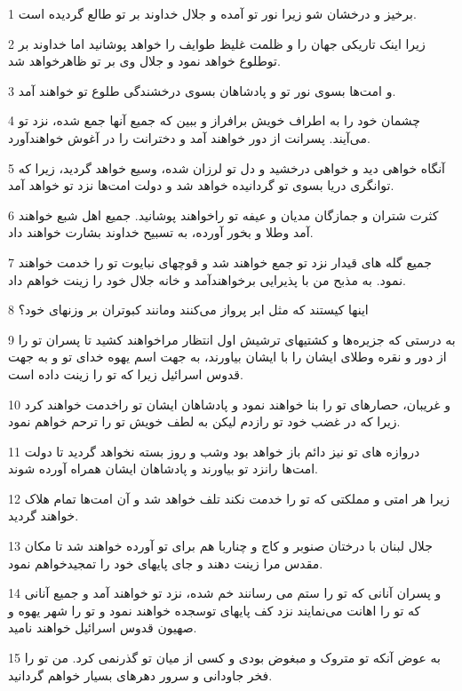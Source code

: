 \par 1 برخیز و درخشان شو زیرا نور تو آمده و جلال خداوند بر تو طالع گردیده است.
\par 2 زیرا اینک تاریکی جهان را و ظلمت غلیظ طوایف را خواهد پوشانید اما خداوند بر توطلوع خواهد نمود و جلال وی بر تو ظاهرخواهد شد.
\par 3 و امت‌ها بسوی نور تو و پادشاهان بسوی درخشندگی طلوع تو خواهند آمد.
\par 4 چشمان خود را به اطراف خویش برافراز و ببین که جمیع آنها جمع شده، نزد تو می‌آیند. پسرانت از دور خواهند آمد و دخترانت را در آغوش خواهند‌آورد.
\par 5 آنگاه خواهی دید و خواهی درخشید و دل تو لرزان شده، وسیع خواهد گردید، زیرا که توانگری دریا بسوی تو گردانیده خواهد شد و دولت امت‌ها نزد تو خواهد آمد.
\par 6 کثرت شتران و جمازگان مدیان و عیفه تو راخواهند پوشانید. جمیع اهل شبع خواهند آمد وطلا و بخور آورده، به تسبیح خداوند بشارت خواهند داد.
\par 7 جمیع گله های قیدار نزد تو جمع خواهند شد و قوچهای نبایوت تو را خدمت خواهند نمود. به مذبح من با پذیرایی برخواهندآمد و خانه جلال خود را زینت خواهم داد.
\par 8 اینها کیستند که مثل ابر پرواز می‌کنند ومانند کبوتران بر وزنهای خود؟
\par 9 به درستی که جزیره‌ها و کشتیهای ترشیش اول انتظار مراخواهند کشید تا پسران تو را از دور و نقره وطلای ایشان را با ایشان بیاورند، به جهت اسم یهوه خدای تو و به جهت قدوس اسرائیل زیرا که تو را زینت داده است.
\par 10 و غریبان، حصارهای تو را بنا خواهند نمود و پادشاهان ایشان تو راخدمت خواهند کرد زیرا که در غضب خود تو رازدم لیکن به لطف خویش تو را ترحم خواهم نمود.
\par 11 دروازه های تو نیز دائم باز خواهد بود وشب و روز بسته نخواهد گردید تا دولت امت‌ها رانزد تو بیاورند و پادشاهان ایشان همراه آورده شوند.
\par 12 زیرا هر امتی و مملکتی که تو را خدمت نکند تلف خواهد شد و آن امت‌ها تمام هلاک خواهند گردید.
\par 13 جلال لبنان با درختان صنوبر و کاج و چناربا هم برای تو آورده خواهند شد تا مکان مقدس مرا زینت دهند و جای پایهای خود را تمجیدخواهم نمود.
\par 14 و پسران آنانی که تو را ستم می رسانند خم شده، نزد تو خواهند آمد و جمیع آنانی که تو را اهانت می‌نمایند نزد کف پایهای توسجده خواهند نمود و تو را شهر یهوه و صهیون قدوس اسرائیل خواهند نامید.
\par 15 به عوض آنکه تو متروک و مبغوض بودی و کسی از میان تو گذرنمی کرد. من تو را فخر جاودانی و سرور دهرهای بسیار خواهم گردانید.
